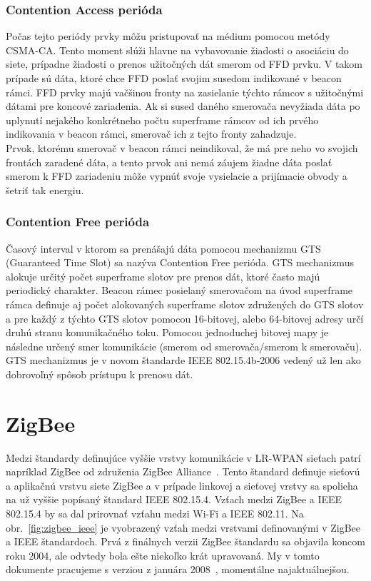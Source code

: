 \subsubsection{Contention Access perióda}
\indent\indent Počas tejto periódy prvky môžu pristupovať na médium pomocou metódy CSMA-CA. Tento moment slúži hlavne na vybavovanie žiadosti o asociáciu do siete, prípadne žiadosti o prenos užitočných dát smerom od FFD prvku. V takom prípade sú dáta, ktoré chce FFD poslať svojim susedom indikované v beacon rámci. FFD prvky majú vačšinou fronty na zasielanie týchto rámcov s užitočnými dátami pre koncové zariadenia. Ak si sused daného smerovača nevyžiada dáta po uplynutí nejakého konkrétneho počtu superframe rámcov od ich prvého indikovania v beacon rámci, smerovač ich z tejto fronty zahadzuje.\\
\indent Prvok, ktorému smerovač v beacon rámci neindikoval, že má pre neho vo svojich frontách zaradené dáta, a tento prvok ani nemá záujem žiadne dáta poslať smerom k FFD zariadeniu môže vypnúť svoje vysielacie a prijímacie obvody a šetriť tak energiu.\\

\subsubsection{Contention Free perióda}
\indent\indent Časový interval v ktorom sa prenášajú dáta pomocou mechanizmu GTS (Guaranteed Time Slot) sa nazýva Contention Free perióda. GTS mechanizmus alokuje určitý počet superframe slotov pre prenos dát, ktoré často majú periodický charakter. Beacon rámec posielaný smerovačom na úvod superframe rámca definuje aj počet alokovaných superframe slotov združených do GTS slotov a pre každý z týchto GTS slotov pomocou 16-bitovej, alebo 64-bitovej adresy určí druhú stranu komunikačného toku. Pomocou jednoduchej bitovej mapy je následne určený smer komunikácie (smerom od smerovača/smerom k smerovaču). GTS mechanizmus je v novom štandarde IEEE 802.15.4b-2006 vedený už len ako dobrovoľný spôsob prístupu k prenosu dát.\\

\section{ZigBee}
\indent\indent Medzi štandardy definujúce vyššie vrstvy komunikácie v LR-WPAN sieťach patrí napríklad ZigBee od združenia ZigBee Alliance~\cite{zigbee_homepage}. Tento štandard definuje sieťovú a aplikačnú vrstvu siete ZigBee a v prípade linkovej a sieťovej vrstvy sa spolieha na už vyššie popísaný štandard IEEE 802.15.4. Vzťach medzi ZigBee a IEEE 802.15.4 by sa dal prirovnať vzťahu medzi Wi-Fi a IEEE 802.11. Na obr.~\ref{fig:zigbee_ieee} je vyobrazený vzťah medzi vrstvami definovanými v ZigBee a IEEE štandardoch. Prvá z finálnych verzii ZigBee štandardu sa objavila koncom roku 2004, ale odvtedy bola ešte niekoľko krát upravovaná. My v tomto dokumente pracujeme s verziou z januára 2008~\cite{zigbee08}, momentálne najaktuálnejšou.\\

